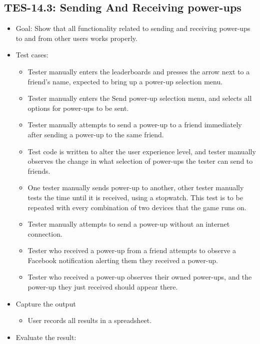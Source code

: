 \subsection{TES-14.3: Sending And Receiving power-ups }
\begin{itemize}
\item Goal: Show that all functionality related to sending and receiving power-ups to and from other users works properly.
\item Test cases: 

\begin{itemize}

\item Tester manually enters the leaderboards and presses the arrow next to a friend's name, expected to bring up a power-up selection menu.
\item Tester manually enters the Send power-up selection menu, and selects all options for power-ups to be sent.
\item Tester manually attempts to send a power-up to a friend immediately after sending a power-up to the same friend.
\item Test code is written to alter the user experience level, and tester manually observes the change in what selection of power-ups the tester can send to friends.
\item One tester manually sends power-up to another, other tester manually tests the time until it is received, using a stopwatch. This
test is to be repeated with every combination of two devices that the game runs on.
\item Tester manually attempts to send a power-up without an internet connection.
\item Tester who received a power-up from a friend attempts to observe a Facebook notification alerting them they received a power-up.
\item Tester who received a power-up observes their owned power-ups, and the power-up they just received should appear there.


\end{itemize}
\item Capture the output 
\begin{itemize}
\item User records all results in a spreadsheet.
\end{itemize}
\item Evaluate the result: 


\end{itemize}
